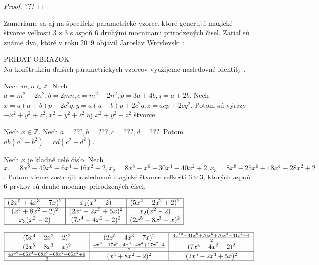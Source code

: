 \begin{proof} 
???
\end{proof}

Zameriame sa aj na špecifické parametrické vzorce, ktoré generujú magické štvorce veľkosti $3 \times 3$ s aspoň $6$ druhými mocninami prirodzených čisel. Zatiaľ sú známe dva, ktoré v roku $2019$ objavil Jaroslav Wrovlevski \cite{multimagie}:

PRIDAT OBRAZOK \\

Na konštrukciu ďalších parametrických vzorcov využijeme nasledovné identity \cite{algebraic}.

\begin{lemma} Nech $m,n \in \mathbb{Z}$. Nech $a = m^2 + 2n^2, b = 2mn, c = m^2 - 2n^2, p = 3a + 4b, q = a+2b$. Nech $x = a(a+b)p - 2c^2q, y = a(a+b)p + 2c^2q, z = acp + 2cq^2$. Potom sú výrazy $- x^2 + y^2 + z^2, x^2 - y^2 + z^2$ aj $x^2 + y^2 - z^2$ štvorce.
\end{lemma}

\begin{lemma} Nech $x \in \mathbb{Z}$. Nech $a = ???, b = ???, c = ???, d = ???$. Potom $ab(a^2 - b^2) = cd(c^2 - d^2)$.
\end{lemma}

\begin{theorem}
\label{3x3square6squares}
Nech $x$ je kladné celé číslo. Nech $x_1 = 8x^8 - 49x^6 + 6x^4 - 16x^2 + 2, x_2 = 8x^8 - x^6 + 30x^4 - 40x^2 + 2, x_3 = 8x^8 - 25x^6 + 18x^4 - 28x^2 + 2$. Potom vieme zostrojiť nasledovné magické štvorce veľkosti $3 \times 3$, ktorých aspoň $6$ prvkov sú druhé mocniny prirodzených čísel.
\end{theorem}

\begin{center}
$\begin{array}{ |c|c|c| } 
\hline
(2x^5 + 4x^3 - 7x)^2 & x_1(x^2 - 2) & (5x^4 - 2x^2 + 2)^2 \\ 
\hline
(x^4 + 8x^2 - 2)^2 & (2x^5 - 2x^3 + 5x)^2 & x_2(x^2 - 2) \\ 
\hline
x_3(x^2 - 2) & (7x^4 - 4x^2 - 2)^2 & (2x^5 - 8x^3 - x)^2 \\
\hline
\end{array}$

$\begin{array}{ |c|c|c| } 
\hline
(5x^4 - 2x^2 + 2)^2 & (2x^5 + 4x^3 - 7x)^2 & \frac{4x^{10} - 31x^8 + 76x^6 + 76x^4 - 31x^2 + 4}{2}\\ 
\hline
(2x^5 - 8x^3 - x)^2 & \frac{4x^{10} + 17x^8 + 4x^6 + 4x^4 + 17x^2 + 4}{2} & (7x^4 - 4x^2 - 2)^2 \\ 
\hline
\frac{4x^{10} + 65x^8 - 68x^6 - 68x^4 + 65x^2 + 4}{2} & (x^4 + 8x^2 - 2)^2 & (2x^5 - 2x^3 + 5x)^2 \\
\hline
\end{array}$
\end{center}

